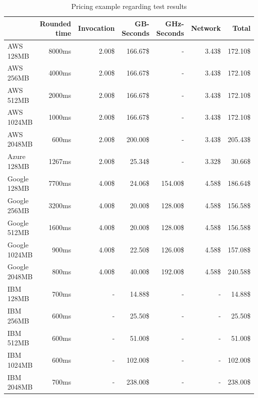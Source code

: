 \begin{table}[htp]
\centering
\captionsetup[table]{justification=centering, labelfont=bf}
\begin{tabular}{|l|r|r|r|r|r|r|} \hline
     &   \textbf{Rounded time}  & \textbf{Invocation} & \textbf{GB-Seconds} & \textbf{GHz-Seconds} & \textbf{Network} & \textbf{Total} \\ \hline
AWS  128MB      & 8000ms&  2.00\$  &  166.67\$     &  -        & 3.43\$ & 172.10\$ \\ \hline
AWS  256MB      & 4000ms&  2.00\$  &  166.67\$     &  -        & 3.43\$ & 172.10\$ \\ \hline
AWS  512MB      & 2000ms&  2.00\$  &  166.67\$     &  -        & 3.43\$ & 172.10\$ \\ \hline
AWS 1024MB      & 1000ms&  2.00\$  &  166.67\$     &  -        & 3.43\$ & 172.10\$ \\ \hline
AWS 2048MB      &  600ms&  2.00\$  &  200.00\$     &  -        & 3.43\$ & 205.43\$ \\ \hline
Azure 128MB     & 1267ms&  2.00\$  &   25.34\$     &  -        & 3.32\$ &  30.66\$ \\ \hline
Google  128MB   & 7700ms&  4.00\$  &   24.06\$     &  154.00\$ & 4.58\$ & 186.64\$ \\ \hline
Google  256MB   & 3200ms&  4.00\$  &   20.00\$     &  128.00\$ & 4.58\$ & 156.58\$ \\ \hline
Google  512MB   & 1600ms&  4.00\$  &   20.00\$     &  128.00\$ & 4.58\$ & 156.58\$ \\ \hline
Google 1024MB   &  900ms&  4.00\$  &   22.50\$     &  126.00\$ & 4.58\$ & 157.08\$ \\ \hline
Google 2048MB   &  800ms&  4.00\$  &   40.00\$     &  192.00\$ & 4.58\$ & 240.58\$ \\ \hline
IBM  128MB      &  700ms&  -       &   14.88\$     &  -        & -      &  14.88\$ \\ \hline
IBM  256MB      &  600ms&  -       &   25.50\$     &  -        & -      &  25.50\$ \\ \hline
IBM  512MB      &  600ms&  -       &   51.00\$     &  -        & -      &  51.00\$ \\ \hline
IBM 1024MB      &  600ms&  -       &  102.00\$     &  -        & -      &  102.00\$ \\ \hline
IBM 2048MB      &  700ms&  -       &  238.00\$     &  -        & -      &  238.00\$ \\ \hline
\end{tabular}
\caption[Pricing example regarding test results]{Pricing example regarding test results}
\label{table:example2}
\end{table}
